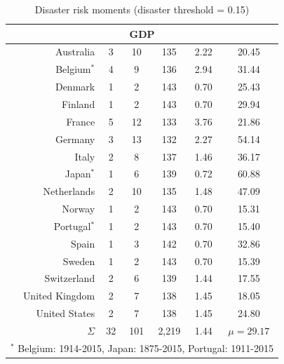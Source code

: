 {{{{{{{{\begin{table}[H]
\begin{center}
\begin{tabular}{rccccc}
\hline
\multicolumn{6}{c}{GDP}\\
\hline
Australia & 3 & 10 & 135 & 2.22 & 20.45\\
Belgium$^{*}$ & 4 & 9 & 136 & 2.94 & 31.44\\
Denmark & 1 & 2 & 143 & 0.70 & 25.43\\
Finland & 1 & 2 & 143 & 0.70 & 29.94\\
France & 5 & 12 & 133 & 3.76 & 21.86\\
Germany & 3 & 13 & 132 & 2.27 & 54.14\\
Italy & 2 & 8 & 137 & 1.46 & 36.17\\
Japan$^{*}$ & 1 & 6 & 139 & 0.72 & 60.88\\
Netherlands & 2 & 10 & 135 & 1.48 & 47.09\\
Norway & 1 & 2 & 143 & 0.70 & 15.31\\
Portugal$^{*}$ & 1 & 2 & 143 & 0.70 & 15.40\\
Spain & 1 & 3 & 142 & 0.70 & 32.86\\
Sweden & 1 & 2 & 143 & 0.70 & 15.39\\
Switzerland & 2 & 6 & 139 & 1.44 & 17.55\\
United Kingdom & 2 & 7 & 138 & 1.45 & 18.05\\
United States & 2 & 7 & 138 & 1.45 & 24.80\\
\hline
$\Sigma$ & 32 & 101 & 2,219 & 1.44 & $\mu=29.17$\\
\hline
\hline
\multicolumn{6}{c}{$^{*}$ Belgium: 1914-2015, Japan: 1875-2015, Portugal: 1911-2015}
\end{tabular} 
\end{center}
\caption{Disaster risk moments (disaster threshold = 0.15)}
\label{tab:disaster_risk_threshold}
\end{table}


}}}}}}}}
